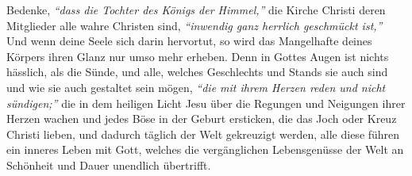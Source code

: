 Bedenke, \textit{"`dass die Tochter des Königs der Himmel,"'} die Kirche Christi
 deren
 Mitglieder alle wahre
Christen
sind, \textit{"`inwendig ganz herrlich geschmückt ist,"'}
Und wenn deine Seele sich darin hervortut, so wird das Mangelhafte deines
Körpers ihren Glanz nur umso mehr erheben. Denn in Gottes Augen ist nichts
hässlich, als die Sünde, und alle, welches Geschlechts und Stands
sie auch
sind und wie sie auch gestaltet sein mögen,
\textit{"`die mit ihrem Herzen reden und
nicht sündigen;"'}
die in dem heiligen Licht Jesu über die
Regungen und Neigungen ihrer Herzen wachen und jedes Böse in der Geburt
ersticken, die das Joch oder Kreuz Christi lieben, und dadurch
täglich der Welt
gekreuzigt werden, alle diese führen ein inneres Leben
mit
Gott, welches die
vergänglichen Lebensgenüsse der Welt an Schönheit und Dauer unendlich
übertrifft.



